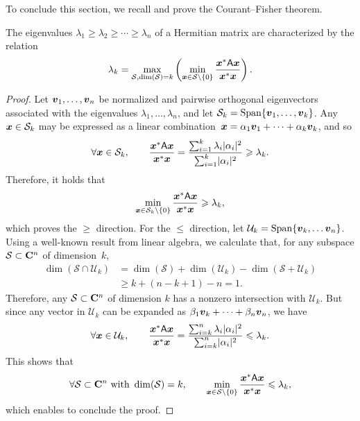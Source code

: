 To conclude this section,
we recall and prove the Courant--Fisher theorem.
\begin{theorem}
    \label{theorem:courant-fisher}
    The eigenvalues $\lambda_1 \geq \lambda_2 \geq \dotsb \geq \lambda_n$ of a Hermitian matrix are characterized by the relation
    \[
        \lambda_k = \max_{\mathcal S, {\rm dim}(\mathcal S) = k} \left( \min_{\mathbf{\boldsymbol{x}} \in \mathcal S \backslash\{0\}} \frac{\mathbf{\boldsymbol{x}}^* \mathsf A \mathbf{\boldsymbol{x}}}{\mathbf{\boldsymbol{x}}^* \mathbf{\boldsymbol{x}}} \right).
    \]
\end{theorem}
\begin{proof}
    Let $\mathbf{\boldsymbol{v}}_1, \dotsc, \mathbf{\boldsymbol{v}}_n$ be normalized and pairwise orthogonal eigenvectors associated with the eigenvalues $\lambda_1, \dotsc, \lambda_n$,
    and let $\mathcal S_k = \operatorname{Span} \{ \mathbf{\boldsymbol{v}}_1, \dotsc, \mathbf{\boldsymbol{v}}_k \}$.
    Any $\mathbf{\boldsymbol{x}} \in \mathcal S_k$ may be expressed as a linear combination~$\mathbf{\boldsymbol{x}} = \alpha_1 \mathbf{\boldsymbol{v}}_1 + \dotsb + \alpha_k \mathbf{\boldsymbol{v}}_k$,
    and so
    \[
        \forall \mathbf{\boldsymbol{x}} \in \mathcal S_k, \qquad
        \frac{\mathbf{\boldsymbol{x}}^* \mathsf A \mathbf{\boldsymbol{x}}}{\mathbf{\boldsymbol{x}}^* \mathbf{\boldsymbol{x}}} =
        \frac{\sum_{i=1}^{k} \lambda_i \lvert\alpha_i\rvert^2}{\sum_{i=1}^{k} \lvert\alpha_i\rvert^2}
        \geqslant \lambda_k.
    \]
    Therefore,
    it holds that
    \[
         \min_{\mathbf{\boldsymbol{x}} \in \mathcal S_k \backslash\{0\}} \frac{\mathbf{\boldsymbol{x}}^* \mathsf A \mathbf{\boldsymbol{x}}}{\mathbf{\boldsymbol{x}}^* \mathbf{\boldsymbol{x}}}  \geqslant \lambda_k,
    \]
    which proves the $\geq$ direction.
    For the $\leq$ direction,
    let $\mathcal U_k = \operatorname{Span} \{ \mathbf{\boldsymbol{v}}_{k}, \dots \mathbf{\boldsymbol{v}}_n \}$.
    Using a well-known result from linear algebra,
    we calculate that, for any subspace $\mathcal S \subset \mathbf C^n$ of dimension~$k$,
    \begin{align*}
        \dim(\mathcal S \cap \mathcal U_k)
        &= \dim(\mathcal S) + \dim(\mathcal U_k) -\dim(\mathcal S + \mathcal U_k) \\
        &\geq  k + (n - k + 1) - n = 1.
    \end{align*}
    Therefore, any $\mathcal S \subset \mathbf C^n$ of dimension $k$
    has a nonzero intersection with $\mathcal U_k$.
    But since any vector in $\mathcal U_k$ can be expanded as $\beta_1 \mathbf{\boldsymbol{v}}_k + \dotsb + \beta_n \mathbf{\boldsymbol{v}}_n$,
    we have
    \[
        \forall \mathbf{\boldsymbol{x}} \in \mathcal U_k, \qquad
        \frac{\mathbf{\boldsymbol{x}}^* \mathsf A \mathbf{\boldsymbol{x}}}{\mathbf{\boldsymbol{x}}^* \mathbf{\boldsymbol{x}}} =
        \frac{\sum_{i=k}^{n} \lambda_i \lvert\alpha_i\rvert^2}{\sum_{i=k}^{n} \lvert\alpha_i\rvert^2}
        \leqslant \lambda_k.
    \]
    This shows that
    \[
        \forall \mathcal S \subset \mathbf C^n \text{ with } \dim(\mathcal S) = k,
        \qquad
         \min_{\mathbf{\boldsymbol{x}} \in \mathcal S \backslash\{0\}} \frac{\mathbf{\boldsymbol{x}}^* \mathsf A \mathbf{\boldsymbol{x}}}{\mathbf{\boldsymbol{x}}^* \mathbf{\boldsymbol{x}}}  \leqslant \lambda_k,
    \]
    which enables to conclude the proof.
\end{proof}

